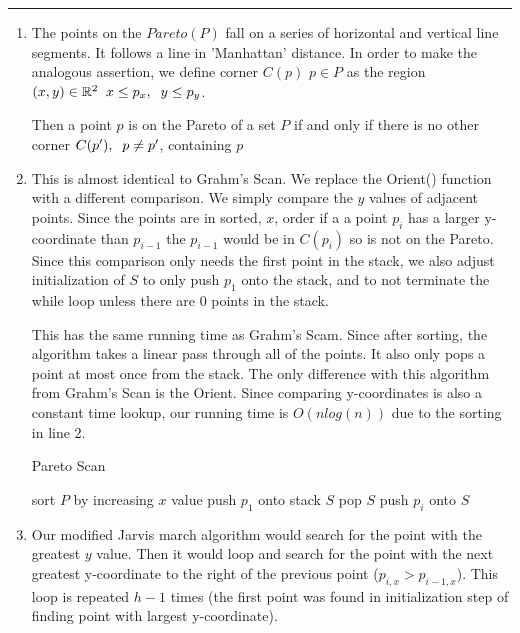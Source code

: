 \documentclass[11pt]{article}
\begin{document}

\hrule

\begin{enumerate}[1. ]
    \item The points on the $Pareto(P)$ fall on a series of horizontal and vertical line segments.
    It follows a line in 'Manhattan' distance. In order to make the analogous assertion,
    we define corner $C(p)$ $p \in P$ as the region $(x,y) \in \reals ^2 \sp x \leq p_x, \sp y \leq p_y$.
    

    Then a point $p$ is on the Pareto of a set $P$ if and only if
    there is no other corner $C(p'), \sp p \neq p'$, containing $p$

    \item 
    This is almost identical to Grahm's Scan. We replace the Orient() function with a different comparison.
    We simply compare the $y$ values of adjacent points. Since the points are in sorted, $x$, order
    if a a point $p_i$ has a larger y-coordinate than $p_{i-1}$ the $p_{i-1}$ would be in $C(p_i)$ so is not on the Pareto.
    Since this comparison only needs the first point in the stack, we also adjust initialization of $S$
    to only push $p_1$ onto the stack, and to not terminate the while loop unless there are $0$ points in the stack.
    
    This has the same running time as Grahm's Scam. Since after sorting, the algorithm takes a linear pass through
    all of the points. It also only pops a point at most once from the stack. The only difference with this algorithm
    from Grahm's Scan is the Orient. Since comparing y-coordinates is also a constant time lookup, our running time is $O(n log(n))$
    due to the sorting in line 2.
    \begin{algorithm}
        \caption{Pareto Scan}\label{guests}
        \begin{algorithmic}[1]
            \State sort $P$ by increasing $x$ value
            \State push $p_1$ onto stack $S$
                    \State pop $S$
                \EndWhile
                \State push $p_i$ onto $S$
            \EndFor
        \EndFunction
        \end{algorithmic}
    \end{algorithm}

    \item Our modified Jarvis march algorithm would search for the point with the greatest $y$ value.
    Then it would loop and search for the point with the next greatest y-coordinate to the right of the previous point ($p_{i,x} > p_{i-1,x}$).
    This loop is repeated $h - 1$ times (the first point was found in initialization step of finding point with largest y-coordinate).


\end{enumerate}
\end{document}
